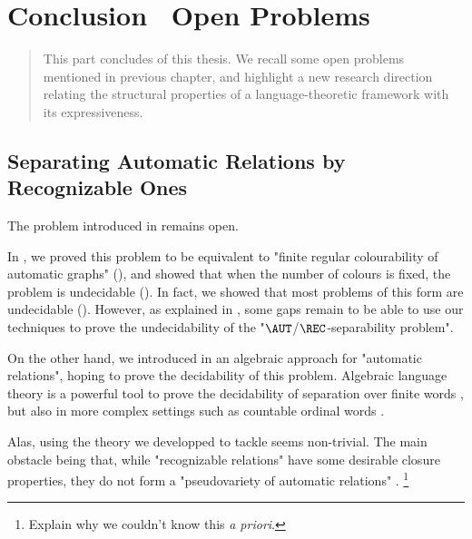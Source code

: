 \chapter{Conclusion \fancyand~Open Problems}
\label{ch:conclu-automatic}

\begin{chapterpresentation}
	\begin{abstract}
		This part concludes  of this thesis.
		We recall some open problems mentioned in previous chapter,
		and highlight a new research direction relating the
		structural properties of a language-theoretic framework
		with its expressiveness.
	\end{abstract}
	\par\bigskip\bigskip
	\chaptertoc
\end{chapterpresentation}

\section{Separating Automatic Relations by Recognizable Ones}

The problem introduced in 
remains open.

\openProblemAutRecSeparability*

In , we proved this problem to be equivalent
to "finite regular colourability of automatic graphs" (),
and showed that when the number of colours is fixed, the problem is undecidable
().
In fact, we showed that most problems of this form are undecidable
().
However, as explained in , some gaps remain to be able to use
our techniques to prove the undecidability of the "$\AUT$/$\REC$-separability problem".

On the other hand, we introduced in  an algebraic approach for
"automatic relations", hoping to prove the decidability of this problem.
Algebraic language theory is a powerful tool to prove the decidability of separation
over finite words \cite{PlaceZeitoun2016SeparatingRegularLanguages},
but also in more complex settings such as countable ordinal words \cite{ColcombetGoolMorvan2022FOSeparation}.

Alas, using the theory we developped to tackle 
seems non-trivial. The main obstacle being that, while
"recognizable relations" have some desirable closure properties,
they do not form a "pseudovariety of automatic relations"
.%
\footnote{Explain why we couldn't know this \emph{a priori}.}

